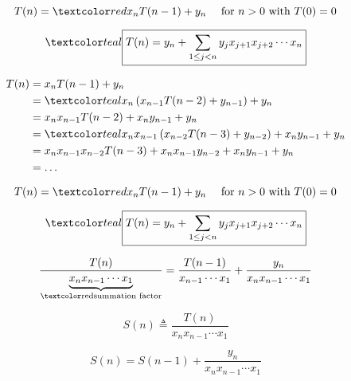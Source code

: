 \begin{frame}{}
  \begin{theorem}
    \[
      T(n) = \red{x_n} T(n-1) + y_n  \quad \text{ for } n > 0 \text{ with } T(0) = 0
    \]

    \[
      \teal{\boxed{T(n) = y_n + \sum_{1 \le j < n} y_j x_{j+1} x_{j+2} \cdots x_n}}
    \]
  \end{theorem}

  \pause
  \begin{align*}
    T(n) &= x_{n} T(n-1) + y_{n} \\
    &= \teal{x_{n} \left( x_{n-1} T(n-2) + y_{n-1} \right) + y_{n}} \\
    &= x_{n} x_{n-1} T(n-2) + x_{n} y_{n-1} + y_{n} \\
    &= \teal{x_{n} x_{n-1} \left( x_{n-2} T(n-3) + y_{n-2} \right) 
     + x_{n} y_{n-1} + y_{n}} \\
    &= x_{n} x_{n-1} x_{n-2} T(n-3) + x_{n} x_{n-1} y_{n-2} + x_{n} y_{n-1} + y_{n} \\
    &= \ldots
  \end{align*}
\end{frame}

\begin{frame}{}
  \begin{theorem}
    \[
      T(n) = \red{x_n} T(n-1) + y_n  \quad \text{ for } n > 0 \text{ with } T(0) = 0
    \]

    \[
      \teal{\boxed{T(n) = y_n + \sum_{1 \le j < n} y_j x_{j+1} x_{j+2} \cdots x_n}} 
    \]
  \end{theorem}

  \pause
  \[
    \frac{T(n)}{\underbrace{x_n x_{n-1} \cdots x_1}_{\text{\red{summation factor}}}}
      = \frac{T(n-1)}{x_{n-1} \cdots x_1} + \frac{y_n}{x_n x_{n-1} \cdots x_1}
  \]

  \pause
  \[
    S(n) \triangleq \frac{T(n)}{x_n x_{n-1} \cdots x_1}
  \]

  \pause
  \[
    S(n) = S(n-1) + \frac{y_n}{x_n x_{n-1} \cdots x_1}
  \]
\end{frame}

